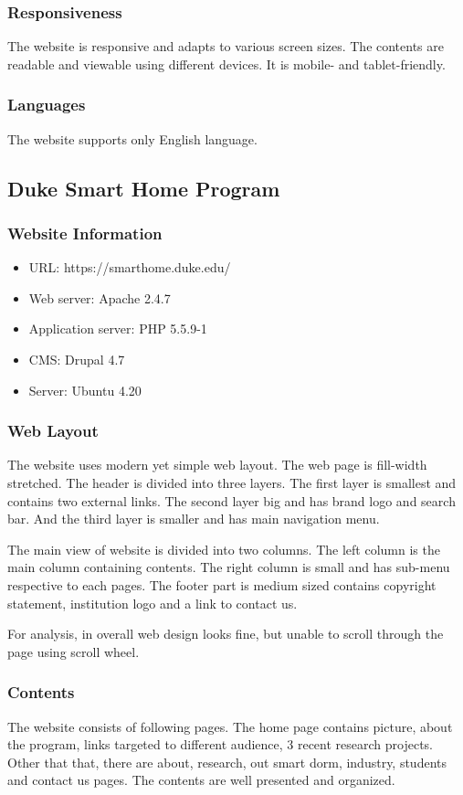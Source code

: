 \subsubsection*{Responsiveness}
The website is responsive and adapts to various screen sizes. The contents are readable and viewable using different devices. It is mobile- and tablet-friendly.

\subsubsection*{Languages}
The website supports only English language.

\subsection{Duke Smart Home Program}
\subsubsection*{Website Information}
\begin{itemize}
\item URL: https://smarthome.duke.edu/
\item Web server: Apache 2.4.7
\item Application server: PHP 5.5.9-1
\item CMS: Drupal 4.7
\item Server: Ubuntu 4.20
\end{itemize}

\subsubsection*{Web Layout}
The website uses modern yet simple web layout. The web page is fill-width stretched. The header is divided into three layers. The first layer is smallest and contains two external links. The second layer big and has brand logo and search bar. And the third layer is smaller and has main navigation menu.

The main view of website is divided into two columns. The left column is the main column containing contents. The right column is small and has sub-menu respective to each pages. The footer part is medium sized contains copyright statement, institution logo and a link to contact us.

For analysis, in overall web design looks fine, but unable to scroll through the page using scroll wheel.

\subsubsection*{Contents}
The website consists of following pages. The home page contains picture, about the program, links targeted to different audience, 3 recent research projects. Other that that, there are about, research, out smart dorm, industry, students and contact us pages. The contents are well presented and organized.

